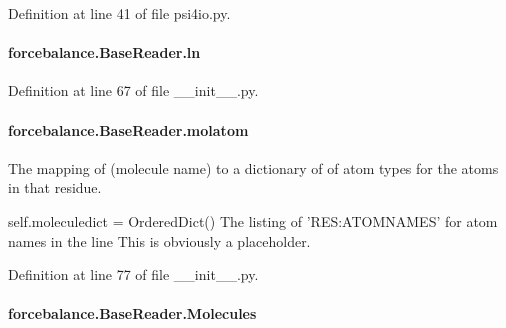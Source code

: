 Definition at line 41 of file psi4io.\-py.

\hypertarget{classforcebalance_1_1BaseReader_a80c8e3bea212600742968aa8669e557b}{
\paragraph[{ln}]{\setlength{\rightskip}{0pt plus 5cm}forcebalance.\-Base\-Reader.\-ln\hspace{0.3cm}{\ttfamily [inherited]}}}\label{classforcebalance_1_1BaseReader_a80c8e3bea212600742968aa8669e557b}


Definition at line 67 of file \-\_\-\-\_\-init\-\_\-\-\_\-.\-py.

\hypertarget{classforcebalance_1_1BaseReader_ab444c213e15929253dd73395ac5f19fc}{
\paragraph[{molatom}]{\setlength{\rightskip}{0pt plus 5cm}forcebalance.\-Base\-Reader.\-molatom\hspace{0.3cm}{\ttfamily [inherited]}}}\label{classforcebalance_1_1BaseReader_ab444c213e15929253dd73395ac5f19fc}


The mapping of (molecule name) to a dictionary of of atom types for the atoms in that residue. 

self.\-moleculedict = Ordered\-Dict() The listing of 'R\-E\-S\-:A\-T\-O\-M\-N\-A\-M\-E\-S' for atom names in the line This is obviously a placeholder. 

Definition at line 77 of file \-\_\-\-\_\-init\-\_\-\-\_\-.\-py.

\hypertarget{classforcebalance_1_1BaseReader_a4369b5fb663a83b11602daa71db6862e}{
\paragraph[{Molecules}]{\setlength{\rightskip}{0pt plus 5cm}forcebalance.\-Base\-Reader.\-Molecules\hspace{0.3cm}{\ttfamily [inherited]}}}\label{classforcebalance_1_1BaseReader_a4369b5fb663a83b11602daa71db6862e}


